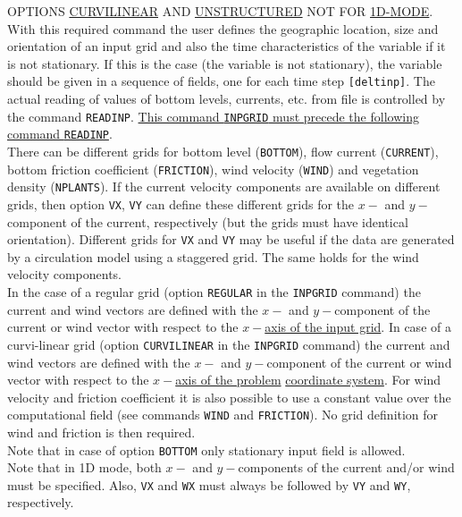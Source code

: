 \documentclass[12pt]{book}
\begin{document}
\noindent
OPTIONS \underline{CURVILINEAR} AND \underline{UNSTRUCTURED} NOT FOR \underline{1D-MODE}.
\\[2ex]
\noindent
With this required command the user defines the geographic location, size and orientation of an input grid
and also the time characteristics of the variable if it is not stationary. If this is the case (the variable is not
stationary), the variable should be given in a sequence of fields, one for each time step {\tt [deltinp]}. The
actual reading of values of bottom levels, currents, etc. from file is controlled by the command {\tt READINP}.
\underline{This command {\tt INPGRID} must precede the following command {\tt READINP}}.
\\[2ex]
\noindent
There can be different grids for bottom level ({\tt BOTTOM}), flow current ({\tt CURRENT}), bottom friction coefficient
({\tt FRICTION}), wind velocity ({\tt WIND}) and vegetation density ({\tt NPLANTS}).
If the current velocity components are available on different grids,
then option {\tt VX}, {\tt VY} can define these different grids for the $x-$ and $y-$component of the current, respectively
(but the grids must have identical orientation). Different grids for {\tt VX} and {\tt VY} may be useful if the data are
generated by a circulation model using a staggered grid. The same holds for the wind velocity
components.
\\[2ex]
\noindent
In the case of a regular grid (option {\tt REGULAR} in the {\tt INPGRID} command) the current and wind vectors
are defined with the $x-$ and $y-$component of the current or wind vector with respect to the \underline{$x-$axis of the input
grid}. In case of a curvi-linear grid (option {\tt CURVILINEAR} in the {\tt INPGRID} command) the current and wind
vectors are defined with the $x-$ and $y-$component of the current or wind vector with respect to the \underline{$x-$axis of
the problem} \underline{coordinate system}. For wind velocity and friction coefficient it is also possible to use a
constant value over the computational field (see commands {\tt WIND} and {\tt FRICTION}). No grid definition for
wind and friction is then required.
\\[2ex]
\noindent
Note that in case of option {\tt BOTTOM} only stationary input field is allowed.
\\[2ex]
\noindent
Note that in 1D mode, both $x-$ and $y-$components of the current and/or wind must be specified. Also, {\tt VX} and {\tt WX}
must always be followed by {\tt VY} and {\tt WY}, respectively.
\\[2ex]
\end{document}
